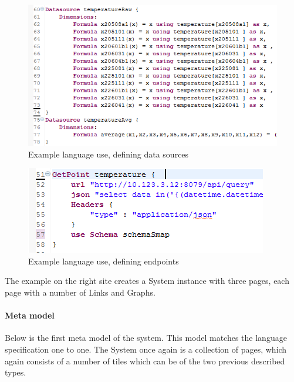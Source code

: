 \begin{figure}
\begin{center}
\includegraphics[width=\linewidth]{images/ExampleUseDataSources}
\end{center}
\caption{Example language use, defining data sources}
\label{fig:exampleDatasources}
\end{figure}

\begin{figure}
\begin{center}
\includegraphics[width=\linewidth]{images/ExampleUseEndPoint}
\end{center}
\caption{Example language use, defining endpoints}
\label{fig:exampleEndpoints}
\end{figure}

The example on the right site creates a System instance with three pages, each page with a number of Links and Graphs.

\paragraph{Meta model}
Below is the first meta model of the system. 
This model matches the language specification one to one. 
The System once again is a collection of pages, which again consists of a number of tiles which can be of the two previous described types. 

